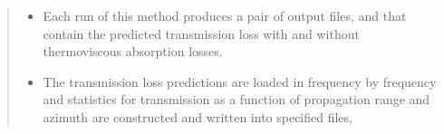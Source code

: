 \documentclass[letterpaper,10pt,english]{sphinxmanual}
\begin{document}
\begin{itemize}
\begin{quote}
\begin{sphinxVerbatim}[commandchars=\\\{\}]
      
    

   
       
\end{sphinxVerbatim}
\begin{itemize}
\item {} 
Each run of this method produces a pair of output files,  and  that contain the predicted transmission loss with and without thermo\sphinxhyphen{}viscous absorption losses.

\item {} 
The transmission loss predictions are loaded in frequency by frequency and statistics for transmission as a function of propagation range and azimuth are constructed and written into specified files,

\end{itemize}


\end{quote}
\end{itemize}
\end{document}
